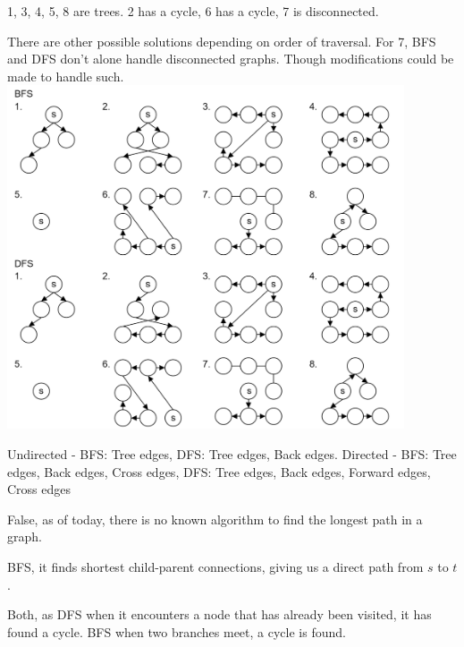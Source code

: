 \newpage 

\begin{Answer} 1, 3, 4, 5, 8 are trees. 2 has a cycle, 6 has a cycle, 7 is disconnected.
\end{Answer}
\begin{Answer} There are other possible solutions depending on order of traversal. For 7,
    BFS and DFS don't alone handle disconnected graphs. Though modifications could be made to handle such.
    \includegraphics[height=4in]{./Sections/graphs/dag/bfs_dfs.png}
\end{Answer}

\vspace{.5em}
\begin{Answer} Undirected - BFS: Tree edges, DFS: Tree edges, Back edges. Directed - BFS: Tree edges, Back edges, Cross edges, DFS: Tree edges, Back edges, Forward edges, Cross edges \cite{cse417dfs2021,dukegraph2017,clrs22-1}
\end{Answer}

\vspace{.5em}
\begin{Answer} False, as of today, there is no known algorithm to find the longest path in a graph.
\end{Answer}

\vspace{.5em}
\begin{Answer} BFS, it finds shortest child-parent connections, giving us a direct path from $s$ to $t$.
\end{Answer}

\vspace{.5em}
\begin{Answer} Both, as DFS when it encounters a node that has already been visited, it has found a cycle. BFS when two branches meet, a cycle is found.
\end{Answer}

